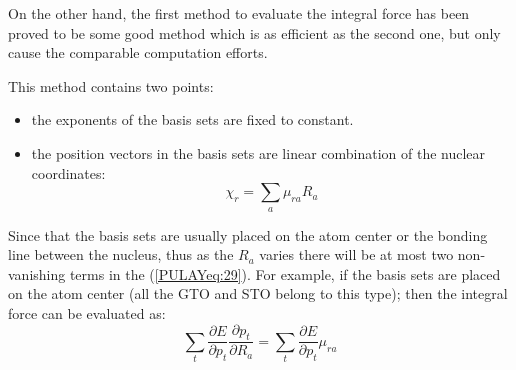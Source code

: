 On the other hand, the first method to evaluate the integral force has
been proved to be some good method which is as efficient as the second
one, but only cause the comparable computation efforts.

This method contains two points:
\begin{itemize}
\item the exponents of the basis sets are fixed to constant.
\item the position vectors in the basis sets are linear combination of
  the nuclear coordinates:
  \begin{equation}\label{PULAYeq:29}
    \chi_{r} = \sum_{a}\mu_{ra}R_{a}
  \end{equation}
\end{itemize}
Since that the basis sets are usually placed on the atom center or the
bonding line between the nucleus, thus as the $R_{a}$ varies there
will be at most two non-vanishing terms in the (\ref{PULAYeq:29}). For
example, if the basis sets are placed on the atom center (all the GTO
and STO belong to this type); then the integral force can be evaluated
as:
\begin{equation}\label{}
  \sum_{t}\frac{\partial E}{\partial p_{t}}\frac{\partial
    p_{t}}{\partial R_{a}} =\sum_{t}\frac{\partial E}{\partial
    p_{t}}\mu_{ra}
\end{equation}





